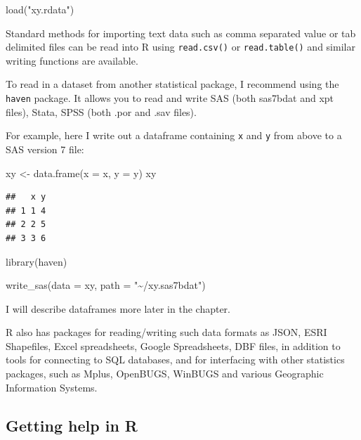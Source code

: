 \documentclass[
]{article}
\newenvironment{Shaded}{\begin{snugshade}}{\end{snugshade}}
\newcommand{\AttributeTok}[1]{\textcolor[rgb]{0.77,0.63,0.00}{#1}}
\newcommand{\FunctionTok}[1]{\textcolor[rgb]{0.00,0.00,0.00}{#1}}
\newcommand{\NormalTok}[1]{#1}
\newcommand{\OtherTok}[1]{\textcolor[rgb]{0.56,0.35,0.01}{#1}}
\newcommand{\StringTok}[1]{\textcolor[rgb]{0.31,0.60,0.02}{#1}}
\begin{document}
\begin{Shaded}
\begin{Highlighting}[]
\FunctionTok{load}\NormalTok{(}\StringTok{"xy.rdata"}\NormalTok{)}
\end{Highlighting}
\end{Shaded}

Standard methods for importing text data such as comma separated value
or tab delimited files can be read into R using \texttt{read.csv()} or
\texttt{read.table()} and similar writing functions are available.

To read in a dataset from another statistical package, I recommend using
the \texttt{haven} package. It allows you to read and write SAS (both sas7bdat
and xpt files), Stata, SPSS (both .por and .sav files).

For example, here I write out a dataframe containing \texttt{x} and \texttt{y} from
above to a SAS version 7 file:

\begin{Shaded}
\begin{Highlighting}[]
\NormalTok{xy }\OtherTok{\textless{}{-}} \FunctionTok{data.frame}\NormalTok{(}\AttributeTok{x =}\NormalTok{ x, }\AttributeTok{y =}\NormalTok{ y)}
\NormalTok{xy}
\end{Highlighting}
\end{Shaded}

\begin{verbatim}
##   x y
## 1 1 4
## 2 2 5
## 3 3 6
\end{verbatim}

\begin{Shaded}
\begin{Highlighting}[]
\FunctionTok{library}\NormalTok{(haven)}

\FunctionTok{write\_sas}\NormalTok{(}\AttributeTok{data =}\NormalTok{ xy,}
          \AttributeTok{path =} \StringTok{"\textasciitilde{}/xy.sas7bdat"}\NormalTok{)}
\end{Highlighting}
\end{Shaded}

I will describe dataframes more later in the chapter.

R also has packages for reading/writing such data formats as JSON, ESRI
Shapefiles, Excel spreadsheets, Google Spreadsheets, DBF files, in
addition to tools for connecting to SQL databases, and for interfacing
with other statistics packages, such as Mplus, OpenBUGS, WinBUGS and
various Geographic Information Systems.

\hypertarget{getting-help-in-r}{%
\subsection{Getting help in R}\label{getting-help-in-r}}
\end{document}
